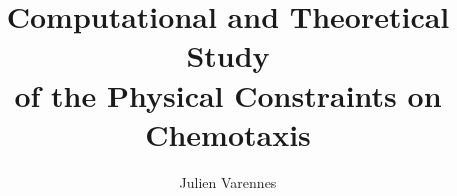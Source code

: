 \documentclass[ece,dissertation]{puthesis}
\title{Computational and Theoretical Study \\ of the Physical Constraints on Chemotaxis}
\author{Julien Varennes}{Varennes, Julien}
\begin{document}
\volume



% 







% 



% 
% 
% 
% 
% 
% 

% 
\end{document}
